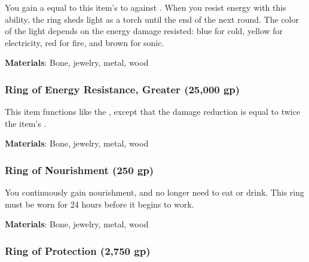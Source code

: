 You gain a  equal to this item's  to  against .
When you resist energy with this ability, the ring sheds light as a torch until the end of the next round.
The color of the light depends on the energy damage resisted: blue for cold, yellow for electricity, red for fire, and brown for sonic.



\vspace{0.25em}
\textbf{Materials}: Bone, jewelry, metal, wood


\lowercase{\hypertarget{item:Ring of Energy Resistance, Greater}{}}\label{item:Ring of Energy Resistance, Greater}
\hypertarget{item:Ring of Energy Resistance, Greater}{\subsubsection{Ring of Energy Resistance, Greater\hfill{} (25,000 gp)}}

This item functions like the , except that the damage reduction is equal to twice the item's .



\vspace{0.25em}
\textbf{Materials}: Bone, jewelry, metal, wood


\lowercase{\hypertarget{item:Ring of Nourishment}{}}\label{item:Ring of Nourishment}
\hypertarget{item:Ring of Nourishment}{\subsubsection{Ring of Nourishment\hfill{} (250 gp)}}

You continuously gain nourishment, and no longer need to eat or drink.
This ring must be worn for 24 hours before it begins to work.



\vspace{0.25em}
\textbf{Materials}: Bone, jewelry, metal, wood


\lowercase{\hypertarget{item:Ring of Protection}{}}\label{item:Ring of Protection}
\hypertarget{item:Ring of Protection}{\subsubsection{Ring of Protection\hfill{} (2,750 gp)}}

